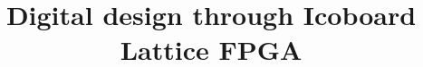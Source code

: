 \documentclass[journal,12pt,twocolumn]{IEEEtran}
\begin{document}

\makeatletter
{}
\makeatother

\let\StandardTheFigure\thefigure
\let\StandardTheTable\thetable
\renewcommand{\thetable}{\theproblem}




\def\putbox#1#2#3{\makebox[0in][l]{\makebox[#1][l]{}\raisebox{\baselineskip}[0in][0in]{\raisebox{#2}[0in][0in]{#3}}}}
     \def\rightbox#1{\makebox[0in][r]{#1}}
     \def\centbox#1{\makebox[0in]{#1}}
     \def\topbox#1{\raisebox{-\baselineskip}[0in][0in]{#1}}
     \def\midbox#1{\raisebox{-0.5\baselineskip}[0in][0in]{#1}}

\vspace{3cm}




\title{Digital design through Icoboard Lattice FPGA}
%
%
%
\end{document}
